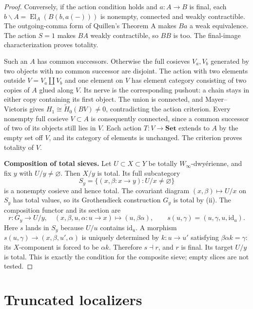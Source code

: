 \documentclass[11pt,a4paper]{article}
\theoremstyle{definition}
\theoremstyle{remark}
\newcommand{\Set}{\mathbf{Set}}
\newcommand{\id}{\mathrm{id}}
\newcommand{\Winfty}{W_\infty}
\newcommand{\El}{\operatorname{El}}
\begin{document}
\begin{proof}
Conversely, if the action condition holds and $a:A\to B$ is final, each $b\backslash A=\El_A(B(b,a(-)))$ is nonempty, connected and weakly contractible. The outgoing-comma form of Quillen's Theorem A makes $Ba$ a weak equivalence. The action $S=1$ makes $BA$ weakly contractible, so $BB$ is too. The final-image characterization proves totality.

Such an $A$ has common successors. Otherwise the full cosieves $V_a,V_b$ generated by two objects with no common successor are disjoint. The action with two elements outside $V=V_a\amalg V_b$ and one element on $V$ has element category consisting of two copies of $A$ glued along $V$. Its nerve is the corresponding pushout: a chain stays in either copy containing its first object. The union is connected, and Mayer--Vietoris gives $H_1\cong\widetilde H_0(BV)\ne0$, contradicting the action criterion. Every nonempty full cosieve $V\subset A$ is consequently connected, since a common successor of two of its objects still lies in $V$. Each action $T:V\to\Set$ extends to $A$ by the empty set off $V$, and its category of elements is unchanged. The criterion proves totality of $V$.

\textbf{Composition of total sieves.}
Let $U\subset X\subset Y$ be totally $\Winfty$-dwy\'erienne, and fix $y$ with $U/y\ne\varnothing$. Then $X/y$ is total. Its full subcategory
\[
 S_y=\{(x,\beta:x\to y):U/x\ne\varnothing\}
\]
is a nonempty cosieve and hence total. The covariant diagram $(x,\beta)\mapsto U/x$ on $S_y$ has total values, so its Grothendieck construction $G_y$ is total by (ii). The composition functor and its section are
\[
 r:G_y\to U/y,\quad(x,\beta,u,\alpha:u\to x)\mapsto(u,\beta\alpha),
 \qquad s(u,\gamma)=(u,\gamma,u,\id_u).
\]
Here $s$ lands in $S_y$ because $U/u$ contains $\id_u$. A morphism $s(u,\gamma)\to(x,\beta,u',\alpha)$ is uniquely determined by $k:u\to u'$ satisfying $\beta\alpha k=\gamma$: its $X$-component is forced to be $\alpha k$. Therefore $s\dashv r$, and $r$ is final. Its target $U/y$ is total. This is exactly the condition for the composite sieve; empty slices are not tested.
\end{proof}


\section{Truncated localizers}

\end{document}
